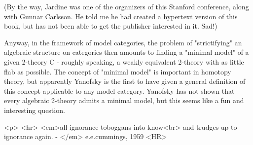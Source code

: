 (By the way, Jardine was one of the organizers of this Stanford conference, 
along with Gunnar Carlsson.  He told me he had created a hypertext version 
of this book, but has not been able to get the publisher interested in it.  
Sad!)

Anyway, in the framework of model categories, the problem of "strictifying" 
an algebraic structure on categories then amounts to finding a "minimal 
model" of a given 2-theory C - roughly speaking, a weakly equivalent 
2-theory with as little flab as possible.  The concept of "minimal model" 
is important in homotopy theory, but apparently Yanofsky is the first to 
have given a general definition of this concept applicable to any model 
category.  Yanofsky has not shown that every algebraic 2-theory admits a 
minimal model, but this seems like a fun and interesting question.


<p> <hr>
<em>all ignorance toboggans into know<br>
and trudges up to ignorance again. - </em> e.e.cummings, 1959
<HR>



